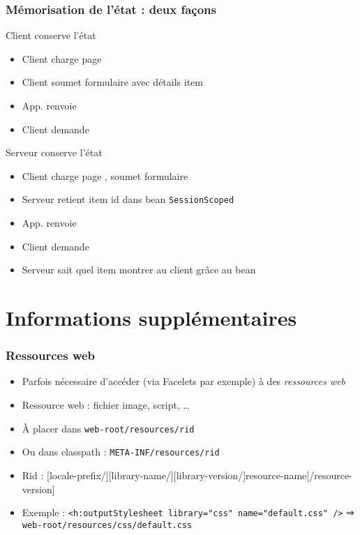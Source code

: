 \documentclass[english, french]{beamer}
\begin{document}
\begin{frame}
	\frametitle{Mémorisation de l’état : deux façons}
	\begin{exampleblock}{Client conserve l’état}
		\begin{itemize}
			\item Client charge page 
			\item Client soumet formulaire avec détails item
			\item App. renvoie {\footnotesize{}}
			\item Client demande 
		\end{itemize}
	\end{exampleblock}
	\begin{exampleblock}{Serveur conserve l’état}
		\begin{itemize}
			\item Client charge page , soumet formulaire
			\item Serveur retient item id dans bean \texttt{SessionScoped}
			\item App. renvoie 
			\item Client demande 
			\item Serveur sait quel item montrer au client grâce au bean\vspace{-2pt}
		\end{itemize}
	\end{exampleblock}
\end{frame}

\section[Suppl]{Informations supplémentaires}
\begin{frame}
	\frametitle{Ressources web}
	\begin{itemize}
		\item Parfois nécessaire d’accéder (via Facelets par exemple) à des \emph{ressources web}
		\item Ressource web : fichier image, script, …
		\item À placer dans \texttt{web-root/resources/rid}
		\item Ou dans classpath : \texttt{META-INF/resources/rid}
		\item Rid : [locale-prefix/][library-name/][library-version/]resource-name[/resource-version]
		\item Exemple : \texttt{<h:outputStylesheet library="css" name="default.css" />} ⇒ \texttt{web-root/resources/css/default.css}
	\end{itemize}
\end{frame}
\end{document}
